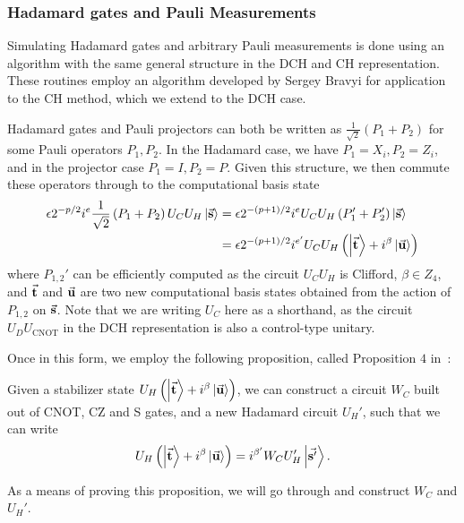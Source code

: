 \subsubsection*{Hadamard gates and Pauli Measurements}
Simulating Hadamard gates and arbitrary Pauli measurements is done using an algorithm with the same general structure in the DCH and CH representation. These routines employ an algorithm developed by Sergey Bravyi for application to the CH method,  which we extend to the DCH case.\par
Hadamard gates and Pauli projectors can both be written as $\frac{1}{\sqrt{2}}\left(P_{1}+P_{2}\right)$ for some Pauli operators $P_{1},P_{2}$. In the Hadamard case, we have $P_{1}=X_{i},P_{2}=Z_{i}$, and in the projector case $P_{1}=I,P_{2}=P$. Given this structure, we then commute these operators through to the computational basis state
\begin{align*}
\epsilon 2^{-p/2}i^{e}\frac{1}{\sqrt{2}}\left(P_{1}+P_{2}\right)U_{C}U_{H}\ket{\va{s}} &=
\epsilon 2^{-(p+1)/2}i^{e} U_{C}U_{H}\left(P_{1}'+P_{2}'\right)\ket{\va{s}} \\ 
&= \epsilon 2^{-(p+1)/2}i^{e'} U_{C}U_{H}\left(\ket{\va{t}}+i^{\beta}\ket{\va{u}}\right)
\end{align*}
where $P_{1,2}'$ can be efficiently computed as the circuit $U_{C}U_{H}$ is Clifford, $\beta\in\mathbb{}Z_{4}$, and $\va{t}$ and $\va{u}$ are two new computational basis states obtained from the action of $P_{1,2}$ on $\va{s}$. Note that we are writing $U_{C}$ here as a shorthand, as the circuit $U_{D}U_{\text{CNOT}}$ in the DCH representation is also a control-type unitary.\par
Once in this form, we employ the following proposition, called Proposition $4$ in~\cite{Bravyi2018}:
\begin{prop}
\label{prop:pseudocz}
Given a stabilizer state $U_{H}\left(\ket{\va{t}}+i^{\beta}\ket{\va{u}}\right)$, we can construct a circuit $W_{C}$ built out of CNOT, CZ and S gates, and a new Hadamard circuit $U_{H}'$, such that we can write
\[U_{H}\left(\ket{\va{t}}+i^{\beta}\ket{\va{u}}\right) = i^{\beta'}W_{C}U_{H}'\ket{\va{s'}}.\]
\end{prop}
As a means of proving this proposition, we will go through and construct $W_{C}$ and $U_{H}'$.
